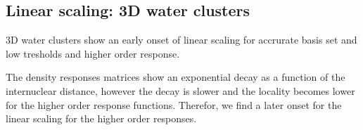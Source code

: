 \documentclass[twocolumn,showpacs,preprintnumbers,amsmath,amssymb]{revtex4}
\begin{document}


\subsection{Linear scaling: 3D water clusters}
3D water clusters show an early onset of linear scaling for accrurate
basis set and low tresholds and higher order response.

The density responses matrices show an exponential decay as a function
of the internuclear distance, however the decay is slower and the locality
becomes lower for the higher order response functions.
Therefor, we find a later onset for the linear scaling for the higher order
responses.
\end{document}
